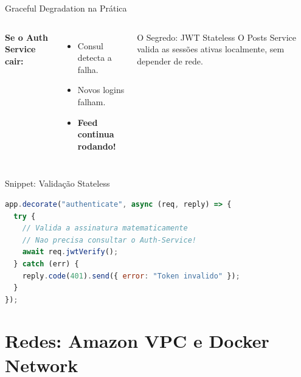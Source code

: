 \documentclass[aspectratio=169,t,xcolor=table]{beamer}
\begin{document}
\begin{frame}{Graceful Degradation na Prática}

    \begin{columns}
        \textbf{Se o Auth Service cair:}
        \begin{itemize}
            \item Consul detecta a falha.
            \item Novos logins falham.
            \item \textbf{Feed continua rodando!}
        \end{itemize}

        \begin{block}{O Segredo: JWT Stateless}
            O Posts Service valida as sessões ativas localmente, sem depender de rede.
        \end{block}
    \end{columns}

\end{frame}

\begin{frame}[fragile]{Snippet: Validação Stateless}

    \begin{lstlisting}[language=JavaScript, caption=Posts Service - Validação Desacoplada]
app.decorate("authenticate", async (req, reply) => {
  try {
    // Valida a assinatura matematicamente
    // Nao precisa consultar o Auth-Service!
    await req.jwtVerify();
  } catch (err) {
    reply.code(401).send({ error: "Token invalido" });
  }
});
    \end{lstlisting}

\end{frame}

\section[UFGBlue]{Redes: Amazon VPC e Docker Network}
\end{document}
